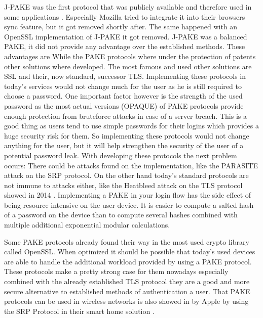 \documentclass[journal]{IEEEtran}
\begin{document}
J-PAKE was the first protocol that was publicly available and therefore used in some applications \cite{hao2008password}.  Especially Mozilla tried to integrate it into their browsers sync feature, but it got removed shortly after.
The same happened with an OpenSSL implementation of J-PAKE it got removed. J-PAKE was a balanced PAKE, it did not provide any advantage over the established methods. These advantages are 
While the PAKE protocols where under the protection of patents other solutions where developed. The most famous and used other solutions are SSL and their, now standard, successor TLS. 
Implementing these protocols in today's services would not change much for the user as he is still required to choose a password. 
One important factor however is the strength of the used password as the most actual versions (OPAQUE) \cite{jarecki2018opaque} of PAKE protocols provide enough protection from bruteforce attacks in case of a server breach.
This is a good thing as users tend to use simple passwords for their logins which provides a huge security risk for them.
So implementing these protocols would not change anything for the user, but it will help strengthen the security of the user of a potential password leak.
With developing these protocols the next problem occurs: There could be attacks found on the implementation, like the PARASITE attack on the SRP protocol.
On the other hand today's standard protocols are not immune to attacks either, like the Heatbleed attack on the TLS protocol showed in 2014 \cite{carvalho2014heartbleed}.
Implementing a PAKE in your login flow has the side effect of being resource intensive on the user device. 
It is easier to compute a salted hash of a password on the device than to compute several hashes combined with multiple additional exponential modular calculations. 

Some PAKE protocols already found their way in the most used crypto library called OpenSSL. 
When optimized it should be possible that today's used devices are able to handle the additional workload provided by using a PAKE protocol. 
These protocols make a pretty strong case for them nowadays especially combined with the already established TLS protocol they are a good   and more secure alternative to established methods of authentication a user.
That PAKE protocols can be used in wireless networks is also showed in by Apple by using the SRP Protocol in their smart home solution \cite{de2021parasite}.
\end{document}
